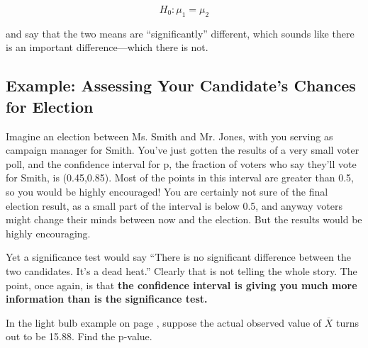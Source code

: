 \begin{equation}
H_0:  \mu_1 = \mu_2
\end{equation}

and say that the two means are ``significantly'' different, which sounds
like there is an important difference---which there is not.

\subsection{Example:  Assessing Your Candidate's Chances for Election}

Imagine an election between Ms. Smith and Mr. Jones, with you serving as
campaign manager for Smith.  You've just gotten the results of a very
small voter poll, and the confidence interval for p, the fraction of
voters who say they'll vote for Smith, is (0.45,0.85).  Most of the
points in this interval are greater than 0.5, so you would be highly
encouraged!  You are certainly not sure of the final election result, as
a small part of the interval is below 0.5, and anyway voters might
change their minds between now and the election.  But the results would
be highly encouraging.

Yet a significance test would say ``There is no significant difference
between the two candidates.  It's a dead heat.''  Clearly that is not
telling the whole story.  The point, once again, is that {\bf the
confidence interval is giving you much more information than is the
significance test.}


\startproblemset

\oneproblem
In the light bulb example on page \pageref{bulbexact}, suppose the actual
observed value of $\overline{X}$ turns out to be 15.88.  Find the p-value.

